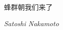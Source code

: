 \vspace*{100毫米} 
\begin{displayquote}{

\large{蜂群朝我们来了}
}

\textit{Satoshi Nakamoto}
\end{displayquote}

\newpage
